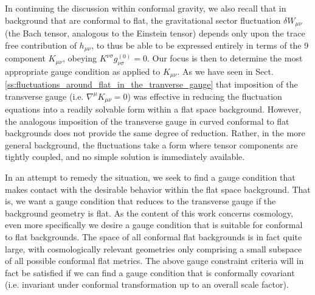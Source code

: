 In continuing the discussion within conformal gravity, we also recall that in background that are conformal to flat, the gravitational sector fluctuation $\delta W_{\mu\nu}$ (the Bach tensor, analogous to the Einstein tensor) depends only upon the trace free contribution of $h_{\mu\nu}$, to thus be able to be expressed entirely in terms of the 9 component $K_{\mu\nu}$, obeying $K^{\nu\sigma}g^{(0)}_{\nu\sigma}=0$. Our focus is then to determine the most appropriate gauge condition as applied to $K_{\mu\nu}$. As we have seen in Sect. \ref{ss:fluctuations_around_flat_in_the_tranverse_gauge} that imposition of the transverse gauge (i.e. $\nabla^\mu K_{\mu\nu} = 0$) was effective in reducing the fluctuation equations into a readily solvable form within a flat space background. However, the analogous imposition of the transverse gauge in curved conformal to flat backgrounds does not provide the same degree of reduction. Rather, in the more general background, the fluctuations take a form where tensor components are tightly coupled, and no simple solution is immediately available. 

In an attempt to remedy the situation, we seek to find a gauge condition that makes contact with the desirable behavior within the flat space background. That is, we want a gauge condition that reduces to the transverse gauge if the background geometry is flat. As the content of this work concerns cosmology, even more specifically we desire a gauge condition that is suitable for conformal to flat backgrounds. The space of all conformal flat backgrounds is in fact quite large, with cosmologically relevant geometries only comprising a small subspace of all possible conformal flat metrics. The above gauge constraint criteria will in fact be satisfied if we can find a gauge condition that is conformally covariant (i.e. invariant under conformal transformation up to an overall scale factor). 

